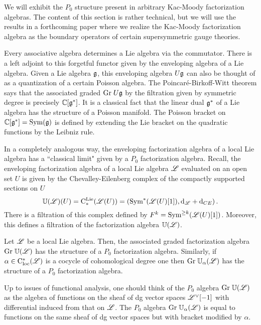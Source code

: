 \documentclass[10pt]{amsart}
\begin{document}
We will exhibit the $P_0$ structure present in arbitrary Kac-Moody factorization algebras. 
The content of this section is rather technical, but we will use the results in a forthcoming paper where we realize the Kac-Moody factorization algebra as the boundary operators of certain supersymmetric gauge theories.
 
Every associative algebra determines a Lie algebra via the commutator. 
There is a left adjoint to this forgetful functor given by the enveloping algebra of a Lie algebra. 
Given a Lie algebra $\mathfrak g$, this enveloping algebra $U \mathfrak g$ can also be thought of as a quantization of a certain Poisson algebra.
The Poincar\'{e}-Birkoff-Witt theorem says that the associated graded ${\rm Gr} \; U \mathfrak g$ by the filtration given by symmetric degree is precisely $\mathbb C[\mathfrak g^*]$.
It is a classical fact that the linear dual $\mathfrak g^*$ of a Lie algebra has the structure of a Poisson manifold. 
The Poisson bracket on $\mathbb C[\mathfrak g^*] = {\rm Sym}(\mathfrak g)$ is defined by extending the Lie bracket on the quadratic functions by the Leibniz rule. 

In a completely analogous way, the enveloping factorization algebra of a local Lie algebra has a ``classical limit" given by a $P_0$ factorization algebra. 
Recall, the enveloping factorization algebra of a local Lie algebra $\mathscr L$ evaluated on an open set $U$ is given by the Chevalley-Eilenberg complex of the compactly supported sections on $U$
\[
\mathbb U(\mathscr L)(U) = {\rm C}^{\rm Lie}_*(\mathscr L(U)) = \left({\rm Sym}^*(\mathscr L(U)[1]), {\rm d}_\mathscr L + {\rm d}_{CE}\right) .
\]
There is a filtration of this complex defined by $F^k = {\rm Sym}^{\geq k} (\mathscr L (U)[1])$. 
Moreover, this defines a filtration of the factorization algebra $\mathbb U(\mathscr L)$. 

\begin{lem} Let $\mathscr L$ be a local Lie algebra. 
Then, the associated graded factorization algebra ${\rm Gr} \; \mathbb U(\mathscr L)$ has the structure of a $P_0$ factorization algebra. 
Similarly, if $\alpha \in {\rm C}_{\rm loc}^*(\mathscr L)$ is a cocycle of cohomological degree one then ${\rm Gr} \; \mathbb U_\alpha(\mathscr L)$ has the structure of a $P_0$ factorization algebra.
\end{lem}

Up to issues of functional analysis, one should think of the $P_0$ algebra ${\rm Gr} \; \mathbb U(\mathscr L)$ as the algebra of functions on the sheaf of dg vector spaces $\mathscr L^\vee [-1]$ with differential induced from that on $\mathscr L$. 
The $P_0$ algebra ${\rm Gr} \; \mathbb U_\alpha(\mathscr L)$ is equal to functions on the same sheaf of dg vector spaces but with bracket modified by $\alpha$. 
\end{document}
